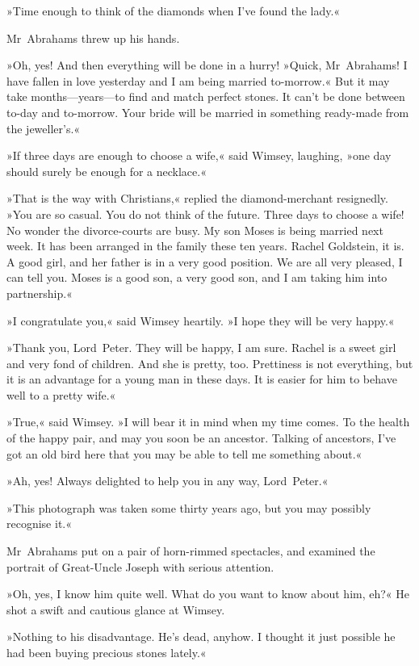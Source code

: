 »Time enough to think of the diamonds when I've found the lady.«

Mr~Abrahams threw up his hands.

»Oh, yes! And then everything will be done in a hurry! »Quick, Mr~Abrahams! I have fallen in love yesterday and I am being married to-morrow.« But it may take months—years—to find and match perfect stones. It can't be done between to-day and to-morrow. Your bride will be married in something ready-made from the jeweller's.«

»If three days are enough to choose a wife,« said Wimsey, laughing, »one day should surely be enough for a necklace.«

»That is the way with Christians,« replied the diamond-merchant resignedly. »You are so casual. You do not think of the future. Three days to choose a wife! No wonder the divorce-courts are busy. My son Moses is being married next week. It has been arranged in the family these ten years. Rachel Goldstein, it is. A good girl, and her father is in a very good position. We are all very pleased, I can tell you. Moses is a good son, a very good son, and I am taking him into partnership.«

»I congratulate you,« said Wimsey heartily. »I hope they will be very happy.«

»Thank you, Lord~Peter. They will be happy, I am sure. Rachel is a sweet girl and very fond of children. And she is pretty, too. Prettiness is not everything, but it is an advantage for a young man in these days. It is easier for him to behave well to a pretty wife.«

»True,« said Wimsey. »I will bear it in mind when my time comes. To the health of the happy pair, and may you soon be an ancestor. Talking of ancestors, I've got an old bird here that you may be able to tell me something about.«

»Ah, yes! Always delighted to help you in any way, Lord~Peter.«

»This photograph was taken some thirty years ago, but you may possibly recognise it.«

Mr~Abrahams put on a pair of horn-rimmed spectacles, and examined the portrait of Great-Uncle Joseph with serious attention.

»Oh, yes, I know him quite well. What do you want to know about him, eh?« He shot a swift and cautious glance at Wimsey.

»Nothing to his disadvantage. He's dead, anyhow. I thought it just possible he had been buying precious stones lately.«

